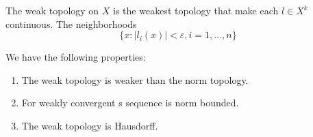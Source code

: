 \documentclass[openany]{book}
\begin{document}



\begin{defn}
    The weak topology on $X$ is the weakest topology that make each $l\in X^k$ continuous. The neighborhoods 
    \begin{equation*}
        \{x: |l_i(x)|<\varepsilon, i=1,\dots, n\}
    \end{equation*}
\end{defn}

\begin{prop}
    We have the following properties:
    \begin{enumerate}
        \item The weak topology is weaker than the norm topology.
        \item For weakly convergent s sequence is norm bounded.
        \item The weak topology is Hausdorff.
    \end{enumerate}
\end{prop}
\end{document}
